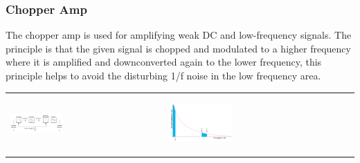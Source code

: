 		\subsubsection{Chopper Amp}
			The chopper amp is used for amplifying weak DC and low-frequency signals. The principle is that the given signal is chopped and modulated to a higher frequency where it is amplified and downconverted again to the lower frequency, this principle helps to avoid the disturbing 1/f noise in the low frequency area. 
			
			\begin{table}[h!]
				\centering
				\begin{tabular}{m{} m{} }
					
					\begin{center}\includegraphics[width=0.35\textwidth]{images/ChopperAmp.png}\end{center} 
				&
							
					\begin{center}\includegraphics[width=0.35\textwidth]{images/Chopperrauschen.png}\end{center} 
				\\
			
				\end{tabular}
			\end{table}			
		
	